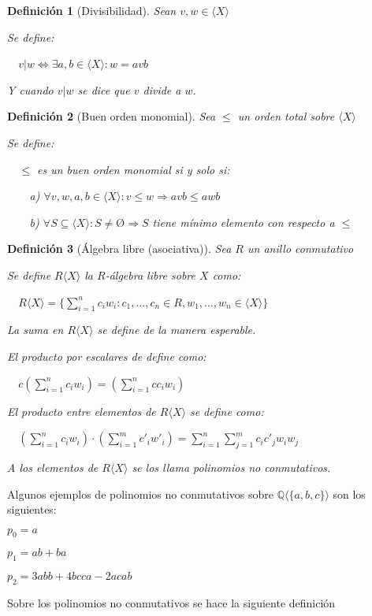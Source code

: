 \documentclass{amsbook}
\theoremstyle{customstyle}
\newtheorem{definition}{Definición}[section]
\newcommand{\definición}[2][]{
  \begin{definition}[#1]
  \setlength{\parindent}{2em} %
  #2
  \end{definition}
}
\begin{document}
\definición[Divisibilidad] {
Sean $v, w ∈ ⟨X⟩$

Se define:

  $v | w ⇔ ∃a , b ∈ ⟨X⟩ : w = avb$

Y cuando $v | w$ se dice que $v$ divide a $w$.
}

\definición[Buen orden monomial] {
Sea $≤$ un orden total sobre $⟨X⟩$

Se define:

  $≤$ es un buen orden monomial si y solo si:

    a) $∀v, w, a, b ∈ ⟨X⟩ : v ≤ w ⇒ avb ≤ awb$

    b) $∀S ⊆ ⟨X⟩ : S ≠ Ø ⇒ S$ tiene mínimo elemento con respecto a $≤$
}

\definición[Álgebra libre (asociativa)] {
Sea $R$ un anillo conmutativo

Se define $R⟨X⟩$ la $R$-álgebra libre sobre $X$ como:

  $R⟨X⟩ = \{\sum_{i = 1}^n c_i w_i : c_1, …, c_n ∈ R, w_1, …, w_n ∈ ⟨X⟩\}$

La suma en $R⟨X⟩$ se define de la manera esperable.

El producto por escalares de define como:

  $c (\sum_{i = 1}^n c_i w_i) = (\sum_{i = 1}^n c c_i w_i)$

El producto entre elementos de $R⟨X⟩$ se define como:

  $(\sum_{i = 1}^n c_i w_i) · (\sum_{i = 1}^m c'_i w'_i) = \sum_{i = 1}^n \sum_{j = 1}^m c_i c'_j w_i w_j$

A los elementos de $R⟨X⟩$ se los llama polinomios no conmutativos.
}

Algunos ejemplos de polinomios no conmutativos sobre $ℚ⟨\{a, b, c\}⟩$ son los siguientes:

$p_0 = a$

$p_1 = ab + ba$

$p_2 = 3 abb + 4 bcca - 2 acab$

Sobre los polinomios no conmutativos se hace la siguiente definición
\end{document}
